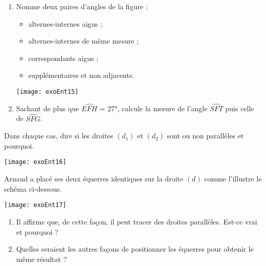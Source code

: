 \begin{exercice}
\begin{enumerate}
\item Nomme deux paires d'angles de la figure :
    \begin{itemize}
    \item alternes-internes aigus ;
    \item alternes-internes de même mesure ;
    \item correspondants aigus ;
    \item supplémentaires et non adjacents.
    \end{itemize}
    
\begin{center}
    \texttt{[image: exoEnt15]}
\end{center}

\item Sachant de plus que $\widehat{EFH}$ = 27°, calcule la mesure de l'angle $\widehat{SFT}$ puis celle de $\widehat{SFG}$.
\end{enumerate}
\end{exercice}





\begin{exercice}
Dans chaque cas, dire si les droites $(d_1)$ et $(d_2)$ sont ou non parallèles et pourquoi.
\begin{center}
    \texttt{[image: exoEnt16]}
\end{center}
\end{exercice} 



\begin{exercice}
Arnaud a placé ses deux équerres identiques sur la droite $(d)$ comme l'illustre le schéma ci-dessous.

\begin{center}
    \texttt{[image: exoEnt17]}
\end{center}

\begin{enumerate}
\item Il affirme que, de cette façon, il peut tracer des droites parallèles. Est-ce vrai et pourquoi ?
\item Quelles seraient les autres façons de positionner les équerres pour obtenir le même résultat ?
\end{enumerate}
\end{exercice} 



